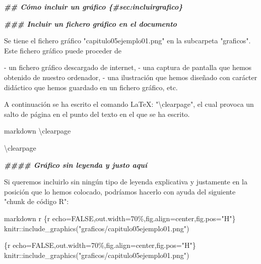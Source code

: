 \documentclass[11pt,a4paper,oneside,]{article}
\newenvironment{Shaded}{\begin{snugshade}}{\end{snugshade}}
\newcommand{\AttributeTok}[1]{\textcolor[rgb]{0.77,0.63,0.00}{#1}}
\newcommand{\DocumentationTok}[1]{\textcolor[rgb]{0.56,0.35,0.01}{\textbf{\textit{#1}}}}
\newcommand{\NormalTok}[1]{#1}
\newcommand{\SpecialCharTok}[1]{\textcolor[rgb]{0.00,0.00,0.00}{#1}}
\newcommand{\StringTok}[1]{\textcolor[rgb]{0.31,0.60,0.02}{#1}}
\numberwithin{dummy}{section}
\theoremstyle{ocrenumbox}
\theoremstyle{blacknumex}
\theoremstyle{blacknumbox}
\theoremstyle{ocrenum}
\theoremstyle{ocrenum}
\begin{document}
\begin{Shaded}
\begin{Highlighting}[numbers=left,,]
\DocumentationTok{\#\# Cómo incluir un gráfico \{\#sec:incluirgrafico\}}


\DocumentationTok{\#\#\# Incluir un fichero gráfico en el documento}

\NormalTok{Se tiene el fichero gráfico }\StringTok{"capitulo05ejemplo01.png"}\NormalTok{ en la subcarpeta }\StringTok{"graficos"}\NormalTok{. Este fichero gráfico}
\NormalTok{puede proceder de }

\SpecialCharTok{{-}}\NormalTok{ un fichero gráfico descargado de internet,}
\SpecialCharTok{{-}}\NormalTok{ una captura de pantalla que hemos obtenido de nuestro ordenador,}
\SpecialCharTok{{-}}\NormalTok{ una ilustración que hemos diseñado con carácter didáctico que hemos guardado en un fichero gráfico, etc.}

\NormalTok{A continuación se ha escrito el comando LaTeX}\SpecialCharTok{:} \StringTok{"\textasciigrave{}\textbackslash{}clearpage\textasciigrave{}"}\NormalTok{, el cual provoca un salto de página en el punto del texto en el que se ha escrito.}

\StringTok{\textasciigrave{}\textasciigrave{}\textasciigrave{}\textasciigrave{}}\NormalTok{markdown}
\NormalTok{\textbackslash{}clearpage}
\StringTok{\textasciigrave{}\textasciigrave{}\textasciigrave{}\textasciigrave{}}

\NormalTok{\textbackslash{}clearpage}


\DocumentationTok{\#\#\#\# Gráfico sin leyenda y justo aquí}

\NormalTok{Si queremos incluirlo sin ningún tipo de leyenda explicativa y justamente en la posición que lo hemos colocado, podríamos hacerlo con ayuda del siguiente }\StringTok{"chunk de código R"}\SpecialCharTok{:}

\StringTok{\textasciigrave{}\textasciigrave{}\textasciigrave{}\textasciigrave{}}\NormalTok{markdown}
\StringTok{\textasciigrave{}}\AttributeTok{r \textquotesingle{}\textquotesingle{}}\StringTok{\textasciigrave{}\textasciigrave{}\textasciigrave{}\textasciigrave{}}\AttributeTok{\{r echo=FALSE,out.width=\textquotesingle{}70\%\textquotesingle{},fig.align=\textquotesingle{}center\textquotesingle{},fig.pos="H"\}}
\AttributeTok{knitr::include\_graphics("graficos/capitulo05ejemplo01.png")}
\StringTok{\textasciigrave{}\textasciigrave{}\textasciigrave{}}
\StringTok{\textasciigrave{}\textasciigrave{}\textasciigrave{}\textasciigrave{}}

\StringTok{\textasciigrave{}\textasciigrave{}\textasciigrave{}}\AttributeTok{\{r echo=FALSE,out.width=\textquotesingle{}70\%\textquotesingle{},fig.align=\textquotesingle{}center\textquotesingle{},fig.pos="H"\}}
\AttributeTok{knitr::include\_graphics("graficos/capitulo05ejemplo01.png")}
\StringTok{\textasciigrave{}\textasciigrave{}\textasciigrave{}}





\end{Highlighting}
\end{Shaded}
\end{document}
